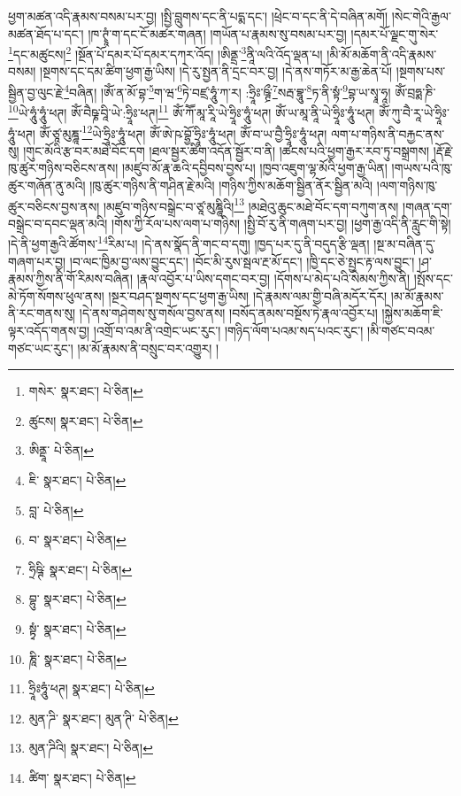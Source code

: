 ཕྱག་མཚན་འདི་རྣམས་བསམ་པར་བྱ། །སྤྱི་བླུགས་དང་ནི་པདྨ་དང་། །ཕྲེང་བ་དང་ནི་དེ་བཞིན་མགོ། །སེང་གེའི་རྒྱལ་མཚན་ཐོད་པ་དང་། །ཁ་ཊྭཱཾ་ག་དང་ངོ་མཚར་གཞན། །གཡོན་པ་རྣམས་སུ་བསམ་པར་བྱ། །དམར་པོ་ལྗང་གུ་སེར་\footnote{གསེར་  སྣར་ཐང་།  པེ་ཅིན། }དང་མཚུངས།\footnote{ཚུངས།  སྣར་ཐང་།  པེ་ཅིན། } །སྔོན་པོ་དམར་པོ་དམར་དཀར་འོད། །ཨིནྡྲ་\footnote{ཨིནྡཱ་  པེ་ཅིན། }ནཱི་ལའི་འོད་ལྡན་པ། །མི་མོ་མཆོག་ནི་འདི་རྣམས་བསམ། །སྔགས་དང་དམ་ཚིག་ཕྱག་རྒྱ་ཡིས། །དེ་རུ་སྤྱན་ནི་དྲང་བར་བྱ། །དེ་ནས་གཏོར་མ་རྒྱ་ཆེན་པོ། །སྔགས་པས་སྦྱིན་བྱ་ལུང་རྗེ་\footnote{ཇི་  སྣར་ཐང་།  པེ་ཅིན། }བཞིན། །ཨོཾ་ན་མོ་བྷ་\footnote{བླ་  པེ་ཅིན། }ག་ཝ་\footnote{བ་  སྣར་ཐང་།  པེ་ཅིན། }ཏེ་བཛྲ་ཧཱུཾ་ཀ་ར། :ཧྲཱིཿ་ཥྚྲྀ་\footnote{ཧྲིཥྚི་  སྣར་ཐང་།  པེ་ཅིན། }སརྦ་བྷཱུ་\footnote{བྷུ་  སྣར་ཐང་།  པེ་ཅིན། }ཏ་ནི་སྟཾ་\footnote{སྟྭཾ་  སྣར་ཐང་།  པེ་ཅིན། }བྷ་ཡ་སྭཱ་ཧཱ། ཨོཾ་བྲཧྨ་ཎི་\footnote{ཎཱི་  སྣར་ཐང་།  པེ་ཅིན། }ཡེ་ཧཱུཾ་ཧཱུཾ་ཕཊ། ཨོཾ་བཻཥྞ་བཱི་ཡེ་:ཧྲཱིཿ་ཕཊ།\footnote{ཧྲཱིཿཧཱུཾ་ཕཊ།  སྣར་ཐང་།  པེ་ཅིན། } ཨོཾ་ཀཽ་མཱ་རཱི་ཡེ་ཧྲཱིཿ་ཧཱུཾ་ཕཊ། ཨོཾ་ཡ་མཱ་ནཱི་ཡེ་ཧྲཱིཿ་ཧཱུཾ་ཕཊ། ཨོཾ་ཀུ་བཻ་རཱ་ཡེ་ཧྲཱིཿ་ཧཱུཾ་ཕཊ། ཨོཾ་ཙཱ་མུཎྜཱ་\footnote{མུན་ཌི་  སྣར་ཐང་། མུན་ཊི་  པེ་ཅིན། }ཡེ་ཧྲཱིཿ་ཧཱུཾ་ཕཊ། ཨོཾ་ཨེ་ཥ་བྷྱོ་ཧྲཱིཿ་ཧཱུཾ་ཕཊ། ཨོཾ་བ་ཡ་བྱཻ་ཧྲཱིཿ་ཧཱུཾ་ཕཊ། ལག་པ་གཉིས་ནི་བརྐྱང་ནས་སུ། །གུང་མོའི་རྩ་བར་མཐེ་བོང་དག །ཐལ་སྦྱར་ཚིག་འདོན་སྦྱོར་བ་ནི། །ཚངས་པའི་ཕྱག་རྒྱར་རབ་ཏུ་བསྒྲགས། །རྡོ་རྗེ་ཁུ་ཚུར་གཉིས་བཅིངས་ནས། །མཛུབ་མོ་རྣ་ཆའི་དབྱིབས་བྱས་པ། །ཁྱབ་འཇུག་ལྷ་མོའི་ཕྱག་རྒྱ་ཡིན། །གཡས་པའི་ཁུ་ཚུར་གཞོན་ནུ་མའི། །ཁུ་ཚུར་གཉིས་ནི་གཤིན་རྗེ་མའི། །གཉིས་ཀྱིས་མཆོག་སྦྱིན་ནོར་སྦྱིན་མའི། །ལག་གཉིས་ཁུ་ཚུར་བཅིངས་བྱས་ནས། །མཛུབ་གཉིས་བསྒྲེང་བ་ཙཱ་མུཎྜཱིའི།\footnote{མུན་ཌིའི།  སྣར་ཐང་།  པེ་ཅིན། } །མཐེའུ་ཆུང་མཐེ་བོང་དག་བཀུག་ནས། །གཞན་དག་བསྒྲེང་བ་དབང་ལྡན་མའི། །གོས་ཀྱི་རོལ་པས་ལག་པ་གཉིས། །སྤྱི་བོ་རུ་ནི་གཞག་པར་བྱ། །ཕྱག་རྒྱ་འདི་ནི་རླུང་གི་སྟེ། །དེ་ནི་ཕྱག་རྒྱའི་ཚོགས་\footnote{ཚིག་  སྣར་ཐང་།  པེ་ཅིན། }རིམ་པ། །དེ་ནས་སྣོད་ནི་གང་བ་དགུ། །ཁྱད་པར་དུ་ནི་བདུད་རྩི་ལྡན། །སྔ་མ་བཞིན་དུ་གཞག་པར་བྱ། །བ་ལང་ཁྱིམ་བྱ་ལས་བྱུང་དང་། །བོང་མི་རུས་སྦལ་རྔ་མོ་དང་། །ཁྱི་དང་ཅེ་སྤྱང་རྟ་ལས་བྱུང་། །ཤ་རྣམས་ཀྱིས་ནི་གོ་རིམས་བཞིན། །རྣལ་འབྱོར་པ་ཡིས་དགང་བར་བྱ། །དོགས་པ་མེད་པའི་སེམས་ཀྱིས་ནི། །སྤོས་དང་མེ་ཏོག་སོགས་ཕུལ་ནས། །སྔར་བཤད་སྔགས་དང་ཕྱག་རྒྱ་ཡིས། །དེ་རྣམས་ལམ་གྱི་བཞི་མདོར་དོར། །མ་མོ་རྣམས་ནི་རང་གནས་སུ། །དེ་ནས་གཤེགས་སུ་གསོལ་བྱས་ནས། །བསོད་ནམས་བསྔོས་ཏེ་རྣལ་འབྱོར་པ། །སྐྱེས་མཆོག་ཇི་ལྟར་འདོད་གནས་བྱ། །འགྲོ་བ་འམ་ནི་འགྲེང་ཡང་རུང་། །གཉིད་ལོག་པའམ་སད་པའང་རུང་། །མི་གཙང་བའམ་གཙང་ཡང་རུང་། །མ་མོ་རྣམས་ནི་བསྲུང་བར་འགྱུར། །
